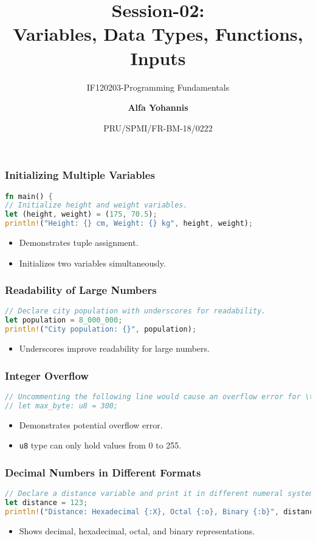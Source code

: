 \documentclass[aspectratio=169, table]{beamer}
\subtitle{IF120203-Programming Fundamentals}
\title{Session-02:\\\LARGE{
Variables, Data Types, Functions,\\
Inputs}}
\date[Serial]{\scriptsize {PRU/SPMI/FR-BM-18/0222}}
\author[Pradita]{\small{\textbf{Alfa Yohannis}}}
\begin{document}
\frame{\titlepage}

\begin{frame}[fragile]
\frametitle{Initializing Multiple Variables}
\begin{lstlisting}[language=Rust]
fn main() {
// Initialize height and weight variables.
let (height, weight) = (175, 70.5);
println!("Height: {} cm, Weight: {} kg", height, weight);
\end{lstlisting}
\begin{itemize}
\item Demonstrates tuple assignment.
\item Initializes two variables simultaneously.
\end{itemize}
\end{frame}

\begin{frame}[fragile]
\frametitle{Readability of Large Numbers}
\begin{lstlisting}[language=Rust]
// Declare city population with underscores for readability.
let population = 8_000_000;
println!("City population: {}", population);
\end{lstlisting}
\begin{itemize}
\item Underscores improve readability for large numbers.
\end{itemize}
\end{frame}

\begin{frame}[fragile]
\frametitle{Integer Overflow}
\begin{lstlisting}[language=Rust]
// Uncommenting the following line would cause an overflow error for \texttt{u8}.
// let max_byte: u8 = 300;
\end{lstlisting}
\begin{itemize}
\item Demonstrates potential overflow error.
\item \texttt{u8} type can only hold values from 0 to 255.
\end{itemize}
\end{frame}

\begin{frame}[fragile]
\frametitle{Decimal Numbers in Different Formats}
\begin{lstlisting}[language=Rust]
// Declare a distance variable and print it in different numeral systems.
let distance = 123;
println!("Distance: Hexadecimal {:X}, Octal {:o}, Binary {:b}", distance, distance, distance);
\end{lstlisting}
\begin{itemize}
\item Shows decimal, hexadecimal, octal, and binary representations.
\end{itemize}
\end{frame}
\end{document}
